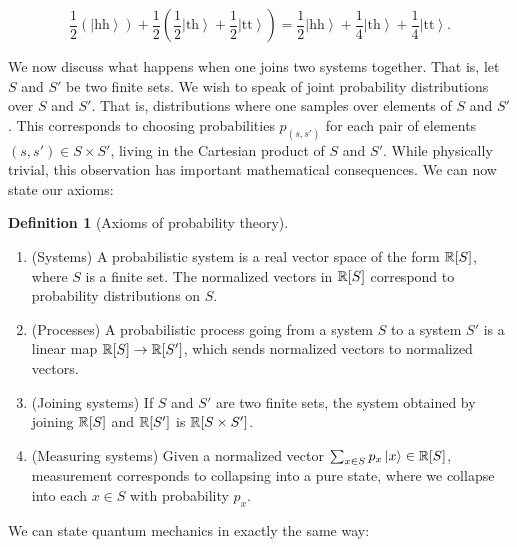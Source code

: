 \documentclass{article}
\theoremstyle{definition}
\newtheorem*{definition}{Definition}
\numberwithin{figure}{section}
\begin{document}
$$\frac{1}{2}\left(\left|\text{hh}\right>\right)+\frac{1}{2}\left(\frac{1}{2}\left|\text{th}\right>+\frac{1}{2}\left|\text{tt}\right>\right)=\frac{1}{2}\left|\text{hh}\right>+\frac{1}{4}\left|\text{th}\right>+\frac{1}{4}\left|\text{tt}\right>.$$

We now discuss what happens when one joins two systems together. That is, let $S$ and $S'$ be two finite sets. We wish to speak of joint probability distributions over $S$ and $S'$. That is, distributions where one samples over elements of $S$ and $S'$. This corresponds to choosing probabilities $p_{(s,s')}$ for each pair of elements $(s,s')\in S\times S'$, living in the Cartesian product of $S$ and $S'$. While physically trivial, this observation has important mathematical consequences. We can now state our axioms:


\begin{definition}[Axioms of probability theory] $\,$

\begin{enumerate}
\item (Systems) A probabilistic system is a real vector space of the form $\mathbb{R}[S]$, where $S$ is a finite set. The normalized vectors in $\mathbb{R}[S]$ correspond to probability distributions on $S$.
\item (Processes) A probabilistic process going from a system $S$ to a system $S'$ is a linear map $\mathbb{R}[S]\to \mathbb{R}[S']$, which sends normalized vectors to normalized vectors.
\item (Joining systems) If $S$ and $S'$ are two finite sets, the system obtained by joining $\mathbb{R}[S]$ and $\mathbb{R}[S']$ is $\mathbb{R}[S\times S']$.
\item (Measuring systems) Given a normalized vector $\sum_{x\in S}p_x \left |x\right>\in \mathbb{R}[S]$, measurement corresponds to collapsing into a pure state, where we collapse into each $x\in S$ with probability $p_x$.
\end{enumerate}

\raggedleft\qedsymbol{}
\end{definition}

We can state quantum mechanics in exactly the same way:
\end{document}
